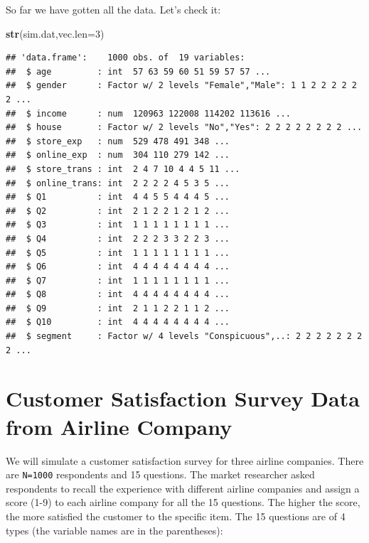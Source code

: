 \documentclass[]{book}
\newenvironment{Shaded}{\begin{snugshade}}{\end{snugshade}}
\newcommand{\KeywordTok}[1]{\textcolor[rgb]{0.13,0.29,0.53}{\textbf{{#1}}}}
\newcommand{\DataTypeTok}[1]{\textcolor[rgb]{0.13,0.29,0.53}{{#1}}}
\newcommand{\DecValTok}[1]{\textcolor[rgb]{0.00,0.00,0.81}{{#1}}}
\newcommand{\StringTok}[1]{\textcolor[rgb]{0.31,0.60,0.02}{{#1}}}
\newcommand{\NormalTok}[1]{{#1}}
\theoremstyle{definition}
\theoremstyle{definition}
\theoremstyle{remark}
\begin{document}
\begin{Shaded}
\end{Shaded}

So far we have gotten all the data. Let's check it:

\begin{Shaded}
\begin{Highlighting}[]
\KeywordTok{str}\NormalTok{(sim.dat,}\DataTypeTok{vec.len=}\DecValTok{3}\NormalTok{)}
\end{Highlighting}
\end{Shaded}

\begin{verbatim}
## 'data.frame':    1000 obs. of  19 variables:
##  $ age         : int  57 63 59 60 51 59 57 57 ...
##  $ gender      : Factor w/ 2 levels "Female","Male": 1 1 2 2 2 2 2 2 ...
##  $ income      : num  120963 122008 114202 113616 ...
##  $ house       : Factor w/ 2 levels "No","Yes": 2 2 2 2 2 2 2 2 ...
##  $ store_exp   : num  529 478 491 348 ...
##  $ online_exp  : num  304 110 279 142 ...
##  $ store_trans : int  2 4 7 10 4 4 5 11 ...
##  $ online_trans: int  2 2 2 2 4 5 3 5 ...
##  $ Q1          : int  4 4 5 5 4 4 4 5 ...
##  $ Q2          : int  2 1 2 2 1 2 1 2 ...
##  $ Q3          : int  1 1 1 1 1 1 1 1 ...
##  $ Q4          : int  2 2 2 3 3 2 2 3 ...
##  $ Q5          : int  1 1 1 1 1 1 1 1 ...
##  $ Q6          : int  4 4 4 4 4 4 4 4 ...
##  $ Q7          : int  1 1 1 1 1 1 1 1 ...
##  $ Q8          : int  4 4 4 4 4 4 4 4 ...
##  $ Q9          : int  2 1 1 2 2 1 1 2 ...
##  $ Q10         : int  4 4 4 4 4 4 4 4 ...
##  $ segment     : Factor w/ 4 levels "Conspicuous",..: 2 2 2 2 2 2 2 2 ...
\end{verbatim}

\section{Customer Satisfaction Survey Data from Airline
Company}\label{customer-satisfaction-survey-data-from-airline-company}

We will simulate a customer satisfaction survey for three airline
companies. There are \texttt{N=1000} respondents and 15 questions. The
market researcher asked respondents to recall the experience with
different airline companies and assign a score (1-9) to each airline
company for all the 15 questions. The higher the score, the more
satisfied the customer to the specific item. The 15 questions are of 4
types (the variable names are in the parentheses):
\end{document}
